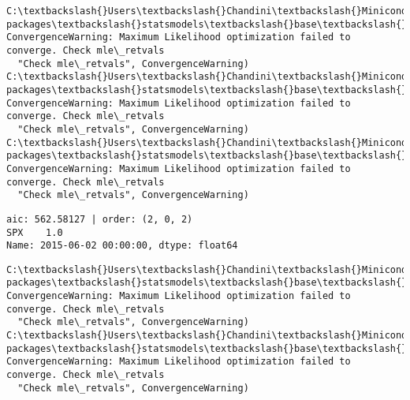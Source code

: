 \documentclass[11pt]{article}
\begin{document}
    \begin{Verbatim}[commandchars=\\\{\}]
C:\textbackslash{}Users\textbackslash{}Chandini\textbackslash{}Miniconda3\textbackslash{}envs\textbackslash{}auquan\textbackslash{}lib\textbackslash{}site-packages\textbackslash{}statsmodels\textbackslash{}base\textbackslash{}model.py:496: ConvergenceWarning: Maximum Likelihood optimization failed to converge. Check mle\_retvals
  "Check mle\_retvals", ConvergenceWarning)
C:\textbackslash{}Users\textbackslash{}Chandini\textbackslash{}Miniconda3\textbackslash{}envs\textbackslash{}auquan\textbackslash{}lib\textbackslash{}site-packages\textbackslash{}statsmodels\textbackslash{}base\textbackslash{}model.py:496: ConvergenceWarning: Maximum Likelihood optimization failed to converge. Check mle\_retvals
  "Check mle\_retvals", ConvergenceWarning)
C:\textbackslash{}Users\textbackslash{}Chandini\textbackslash{}Miniconda3\textbackslash{}envs\textbackslash{}auquan\textbackslash{}lib\textbackslash{}site-packages\textbackslash{}statsmodels\textbackslash{}base\textbackslash{}model.py:496: ConvergenceWarning: Maximum Likelihood optimization failed to converge. Check mle\_retvals
  "Check mle\_retvals", ConvergenceWarning)

    \end{Verbatim}

    \begin{Verbatim}[commandchars=\\\{\}]
aic: 562.58127 | order: (2, 0, 2)
SPX    1.0
Name: 2015-06-02 00:00:00, dtype: float64

    \end{Verbatim}

    \begin{Verbatim}[commandchars=\\\{\}]
C:\textbackslash{}Users\textbackslash{}Chandini\textbackslash{}Miniconda3\textbackslash{}envs\textbackslash{}auquan\textbackslash{}lib\textbackslash{}site-packages\textbackslash{}statsmodels\textbackslash{}base\textbackslash{}model.py:496: ConvergenceWarning: Maximum Likelihood optimization failed to converge. Check mle\_retvals
  "Check mle\_retvals", ConvergenceWarning)
C:\textbackslash{}Users\textbackslash{}Chandini\textbackslash{}Miniconda3\textbackslash{}envs\textbackslash{}auquan\textbackslash{}lib\textbackslash{}site-packages\textbackslash{}statsmodels\textbackslash{}base\textbackslash{}model.py:496: ConvergenceWarning: Maximum Likelihood optimization failed to converge. Check mle\_retvals
  "Check mle\_retvals", ConvergenceWarning)

    \end{Verbatim}
\end{document}
